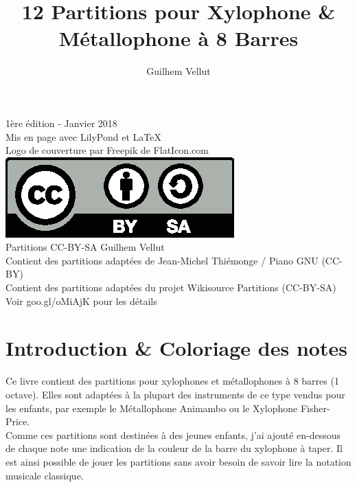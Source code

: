\documentclass[17pt,letterpaper]{extarticle}
\title{12 Partitions pour Xylophone \& Métallophone à 8 Barres}
\author{Guilhem Vellut}
\date{}
\makeatletter
\def\clearleftpage{\clearpage\ifodd\c@page\else
\hbox{}\newpage\if@twocolumn\hbox{}\newpage\fi\fi}
\makeatother
\begin{document}
\setcounter{secnumdepth}{-1}
\setcounter{page}{1}

\maketitle

\clearpage
\vspace*{\fill}

{\tiny 1ère édition - Janvier 2018 \\ Mis en page avec LilyPond et \LaTeX \\
Logo de couverture par Freepik de FlatIcon.com\\
\newline
\includegraphics{by-sa} \\
\newline
Partitions CC-BY-SA Guilhem Vellut\\
Contient des partitions adaptées de Jean-Michel Thiémonge / Piano GNU (CC-BY)\\
Contient des partitions adaptées du projet Wikisource Partitions (CC-BY-SA)\\
Voir goo.gl/oMiAjK pour les détails \par}

\clearpage

\tableofcontents

\clearleftpage

\section{Introduction \& Coloriage des notes}

Ce livre contient des partitions pour xylophones et métallophones à 8 barres (1 octave). Elles sont adaptées à la plupart des instruments de ce type vendus pour les enfants, par exemple le Métallophone Animambo ou le Xylophone Fisher-Price.\\

Comme ces partitions sont destinées à des jeunes enfants, j'ai ajouté en-dessous de chaque note une indication de la couleur de la barre du xylophone à taper. Il est ainsi possible de jouer les partitions sans avoir besoin de savoir lire la notation musicale classique.\\
\end{document}
